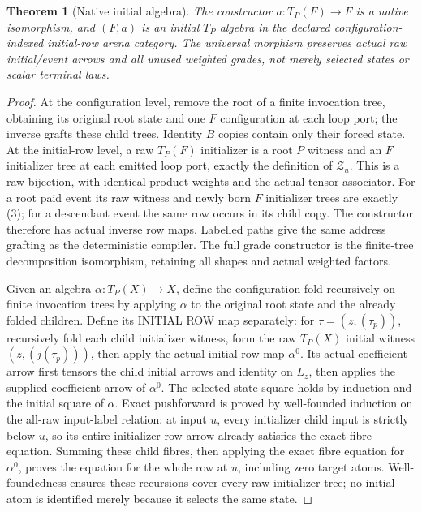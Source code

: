 \documentclass[11pt]{article}
\newtheorem{theorem}{Theorem}\newtheorem{definition}{Definition}
\begin{document}
\begin{theorem}[Native initial algebra]
The constructor $a:T_P(F)\to F$ is a native isomorphism, and $(F,a)$ is an initial $T_P$ algebra in the declared configuration-indexed initial-row arena category. The universal morphism preserves actual raw initial/event arrows and all unused weighted grades, not merely selected states or scalar terminal laws.
\end{theorem}
\begin{proof}
At the configuration level, remove the root of a finite invocation tree, obtaining its original root state and one $F$ configuration at each loop port; the inverse grafts these child trees. Identity $B$ copies contain only their forced state. At the initial-row level, a raw $T_P(F)$ initializer is a root $P$ witness and an $F$ initializer tree at each emitted loop port, exactly the definition of $\mathcal Z_u$. This is a raw bijection, with identical product weights and the actual tensor associator. For a root paid event its raw witness and newly born $F$ initializer trees are exactly (3); for a descendant event the same row occurs in its child copy. The constructor therefore has actual inverse row maps. Labelled paths give the same address grafting as the deterministic compiler. The full grade constructor is the finite-tree decomposition isomorphism, retaining all shapes and actual weighted factors.

Given an algebra $\alpha:T_P(X)\to X$, define the configuration fold recursively on finite invocation trees by applying $\alpha$ to the original root state and the already folded children. Define its INITIAL ROW map separately: for $\tau=(z,(\tau_p))$, recursively fold each child initializer witness, form the raw $T_P(X)$ initial witness $(z,(j(\tau_p)))$, then apply the actual initial-row map $\alpha^0$. Its actual coefficient arrow first tensors the child initial arrows and identity on $L_z$, then applies the supplied coefficient arrow of $\alpha^0$. The selected-state square holds by induction and the initial square of $\alpha$. Exact pushforward is proved by well-founded induction on the all-raw input-label relation: at input $u$, every initializer child input is strictly below $u$, so its entire initializer-row arrow already satisfies the exact fibre equation. Summing these child fibres, then applying the exact fibre equation for $\alpha^0$, proves the equation for the whole row at $u$, including zero target atoms. Well-foundedness ensures these recursions cover every raw initializer tree; no initial atom is identified merely because it selects the same state.


\end{proof}
\end{document}
